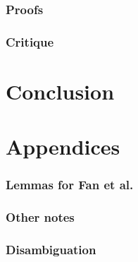 \documentclass{report}
\begin{document}
\subsection{Proofs}

\subsection{Critique}


\chapter{Conclusion}


\newpage
\chapter{Appendices}
\subsection{Lemmas for Fan et al.}

\subsection{Other notes}


\newpage
\subsection{Disambiguation}

\newpage
{}
\end{document}
